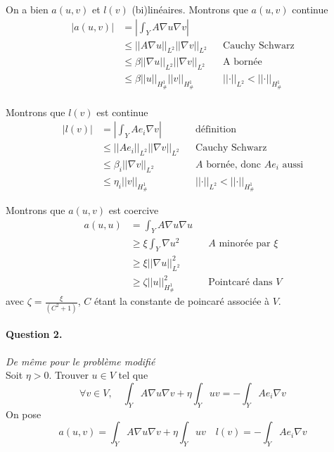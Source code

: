 \documentclass[11pt]{article}
\newcommand{\norm}[1]{\left|\left|#1\right|\right|}
\newcommand{\question}[2]{\paragraph{Question #1.}\textit{#2} \\}
\newcommand{\Hd}{H^1_{\#}}
\begin{document}
On a bien $a(u,v)$ et $l(v)$ (bi)linéaires. Montrons que $a(u,v)$ continue 
\begin{align}
  \label{eq:ac}
  \big|a(u,v)\big| &= \left| \int_Y A \nabla u \nabla v \right| \\
                   &\leq \norm{A\nabla u}_{L^2} \norm{\nabla v}_{L^2} && \mbox{Cauchy Schwarz} \\
                   &\leq \beta \norm{\nabla u}_{L^2} \norm{\nabla v}_{L^2} && \mbox{A bornée} \\
                   &\leq \beta \norm{u}_{\Hd} \norm{v}_{\Hd} && \norm{\cdot}_{L^2}<\norm{\cdot}_{\Hd} \\
\end{align}

Montrons que $l(v)$ est continue
\begin{align}
  \label{eq:ac}
  \big|l(v)\big| &= \left| \int_Y A e_i \nabla v \right|  && \text{définition} \\
                 &\leq \norm{Ae_i}_{L^2} \norm{\nabla v}_{L^2} && \text{Cauchy Schwarz} \\
                 &\leq \beta_i \norm{\nabla v}_{L^2} && \text{$A$ bornée, donc $A e_i$ aussi} \\
                 &\leq \eta_i \norm{v}_{\Hd} && \norm{\cdot}_{L^2}<\norm{\cdot}_{\Hd}
\end{align}

Montrons que $a(u,v)$ est coercive
\begin{align}
  \label{eq:co}
  a(u,u) &= \int_Y A \nabla u  \nabla u \\
         &\geq \xi \int_Y \nabla u^2  && \text{$A$ minorée par $\xi$}\\
         &\geq \xi \norm{\nabla u}^2_{L^2} \\
         &\geq \zeta \norm{u}^2_{\Hd} && \text{Pointcaré dans $V$} 
\end{align}
avec $\zeta = \frac{\xi}{(C^2+1)}$, $C$ étant la constante de poincaré associée à $V$.


\question{2}{De même pour le problème modifié}

Soit $\eta>0$. Trouver $u \in V$ tel que
\begin{equation}
  \label{eq:pbcelleta}
  \forall v \in V, \quad \int_Y A \nabla u \nabla v + \eta \int_Y u v = - \int_Y A e_i \nabla v
\end{equation}
On pose
\begin{equation}
  a(u,v) = \int_Y A \nabla u \nabla v + \eta \int_Y u v \quad
  l(v) = -\int_Y A e_i \nabla v
\end{equation}
\end{document}
